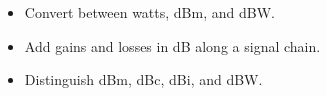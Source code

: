 \begin{objectives}
\begin{itemize}[leftmargin=1.4em,itemsep=2pt]
\item Convert between watts, dBm, and dBW.
\item Add gains and losses in dB along a signal chain.
\item Distinguish dBm, dBc, dBi, and dBW.
\end{itemize}
\end{objectives}

